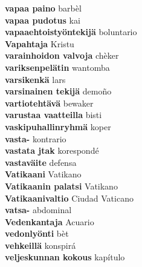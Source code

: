 \textbf{ vapaa paino  } barbèl \\
\textbf{ vapaa pudotus  } kai \\
\textbf{ vapaaehtoistyöntekijä  } boluntario \\
\textbf{ Vapahtaja  } Kristu \\
\textbf{ varainhoidon valvoja  } chèker \\
\textbf{ variksenpelätin  } wantomba \\
\textbf{ varsikenkä  } lars \\
\textbf{ varsinainen tekijä  } demoño \\
\textbf{ vartiotehtävä  } bewaker \\
\textbf{ varustaa vaatteilla  } bisti \\
\textbf{ vaskipuhallinryhmä  } koper \\
\textbf{ vasta-  } kontrario \\
\textbf{ vastata jtak  } korespondé \\
\textbf{ vastaväite  } defensa \\
\textbf{ Vatikaani  } Vatikano \\
\textbf{ Vatikaanin palatsi  } Vatikano \\
\textbf{ Vatikaanivaltio  } Ciudad Vaticano \\
\textbf{ vatsa-  } abdominal \\
\textbf{ Vedenkantaja  } Acuario \\
\textbf{ vedonlyönti  } bèt \\
\textbf{ vehkeillä  } konspirá \\
\textbf{ veljeskunnan kokous  } kapítulo \\
